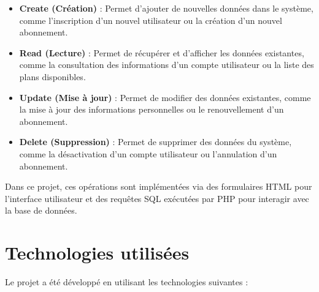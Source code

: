 \documentclass[12pt,a4paper]{report}
\begin{document}
\begin{itemize}
    \item \textbf{Create (Création)} : Permet d'ajouter de nouvelles données dans le système, comme l'inscription d'un nouvel utilisateur ou la création d'un nouvel abonnement.
    
    \item \textbf{Read (Lecture)} : Permet de récupérer et d'afficher les données existantes, comme la consultation des informations d'un compte utilisateur ou la liste des plans disponibles.
    
    \item \textbf{Update (Mise à jour)} : Permet de modifier des données existantes, comme la mise à jour des informations personnelles ou le renouvellement d'un abonnement.
    
    \item \textbf{Delete (Suppression)} : Permet de supprimer des données du système, comme la désactivation d'un compte utilisateur ou l'annulation d'un abonnement.
\end{itemize}

Dans ce projet, ces opérations sont implémentées via des formulaires HTML pour l'interface utilisateur et des requêtes SQL exécutées par PHP pour interagir avec la base de données.

\section{Technologies utilisées}
Le projet a été développé en utilisant les technologies suivantes :
\end{document}
